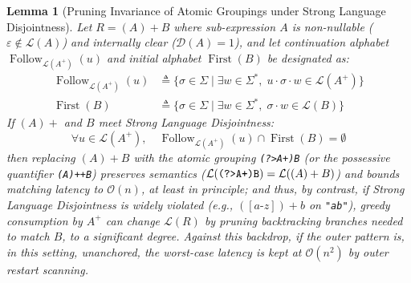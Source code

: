 \documentclass{ieeeaccess}
\newtheorem{lemma}{Lemma}
\begin{document}
\begin{lemma}[Pruning Invariance of Atomic Groupings under Strong Language Disjointness]\label{lem:atomic_invariance}
Let $R = (A)+B$ where sub-expression $A$ is non-nullable ($\varepsilon \notin \mathcal{L}(A)$) and internally clear ($\mathcal{D}(A) = 1$), and let continuation alphabet $\operatorname{Follow}_{\mathcal{L}(A^+)}(u)$ and initial alphabet $\operatorname{First}(B)$ be designated as:
\begin{align}
\operatorname{Follow}_{\mathcal{L}(A^+)}(u) &\triangleq \{\sigma \in \Sigma \mid \exists w \in \Sigma^*, \; u \cdot \sigma \cdot w \in \mathcal{L}(A^+)\} \label{eq:def_follow} \\
\operatorname{First}(B) &\triangleq \{\sigma \in \Sigma \mid \exists w \in \Sigma^*, \; \sigma \cdot w \in \mathcal{L}(B)\} \label{eq:def_first}
\end{align}
If $(A)+$ and $B$ meet Strong Language Disjointness:
\begin{equation}\label{eq:strong_disjointness_cond}
\forall u \in \mathcal{L}(A^+), \quad \operatorname{Follow}_{\mathcal{L}(A^+)}(u) \cap \operatorname{First}(B) = \emptyset
\end{equation}
then replacing $(A)+B$ with the atomic grouping \texttt{(?>A+)B} (or the possessive quantifier \texttt{(A)++B}) preserves semantics ($\mathcal{L}(\text{\texttt{(?>A+)B}}) = \mathcal{L}((A)+B)$) and bounds matching latency to $\mathcal{O}(n)$, at least in principle; and thus, by contrast, if Strong Language Disjointness is widely violated (e.g., $([a\text{-}z])+b$ on \texttt{"ab"}), greedy consumption by $A^+$ can change $\mathcal{L}(R)$ by pruning backtracking branches needed to match $B$, to a significant degree. Against this backdrop, if the outer pattern is, in this setting, unanchored, the worst-case latency is kept at $\mathcal{O}(n^2)$ by outer restart scanning.
\end{lemma}
\end{document}
